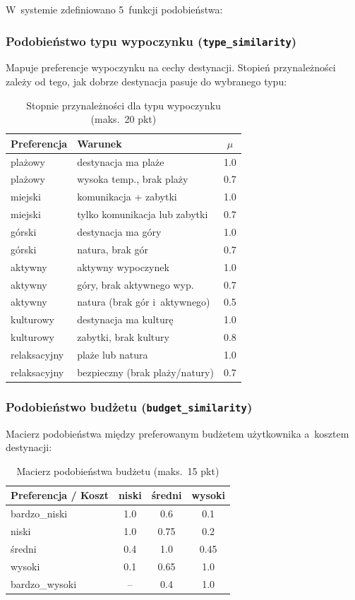 \documentclass[12pt,a4paper]{article}
\begin{document}
W~systemie zdefiniowano 5~funkcji podobieństwa:

\subsubsection{Podobieństwo typu wypoczynku (\texttt{type\_similarity})}

Mapuje preferencje wypoczynku na cechy destynacji. Stopień przynależności zależy od tego, jak dobrze destynacja pasuje do wybranego typu:

\begin{table}[H]
\centering
\small
\begin{tabular}{llc}
\toprule
\textbf{Preferencja} & \textbf{Warunek} & $\mu$ \\
\midrule
plażowy & destynacja ma plaże & 1.0 \\
plażowy & wysoka temp., brak plaży & 0.7 \\
miejski & komunikacja + zabytki & 1.0 \\
miejski & tylko komunikacja lub zabytki & 0.7 \\
górski & destynacja ma góry & 1.0 \\
górski & natura, brak gór & 0.7 \\
aktywny & aktywny wypoczynek & 1.0 \\
aktywny & góry, brak aktywnego wyp. & 0.7 \\
aktywny & natura (brak gór i~aktywnego) & 0.5 \\
kulturowy & destynacja ma kulturę & 1.0 \\
kulturowy & zabytki, brak kultury & 0.8 \\
relaksacyjny & plaże lub natura & 1.0 \\
relaksacyjny & bezpieczny (brak plaży/natury) & 0.7 \\
\bottomrule
\end{tabular}
\caption{Stopnie przynależności dla typu wypoczynku (maks.\ 20 pkt)}
\end{table}

\subsubsection{Podobieństwo budżetu (\texttt{budget\_similarity})}

Macierz podobieństwa między preferowanym budżetem użytkownika a~kosztem destynacji:

\begin{table}[H]
\centering
\begin{tabular}{l|ccc}
\toprule
\textbf{Preferencja / Koszt} & \textbf{niski} & \textbf{średni} & \textbf{wysoki} \\
\midrule
bardzo\_niski & 1.0 & 0.6 & 0.1 \\
niski & 1.0 & 0.75 & 0.2 \\
średni & 0.4 & 1.0 & 0.45 \\
wysoki & 0.1 & 0.65 & 1.0 \\
bardzo\_wysoki & -- & 0.4 & 1.0 \\
\bottomrule
\end{tabular}
\caption{Macierz podobieństwa budżetu (maks.\ 15 pkt)}
\end{table}
\end{document}
